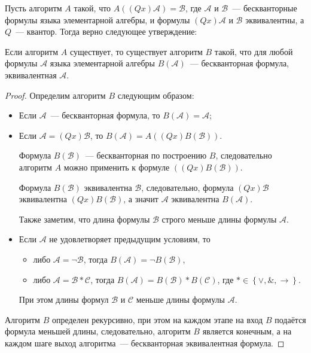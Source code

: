 Пусть алгоритм $A$ такой, что $A\left(\left(Qx\right)\mathcal{A}\right) = \mathcal{B}$, где $\mathcal{A}$ и $\mathcal{B}$~--- бескванторные формулы языка элементарной алгебры, и формулы $(Qx)\mathcal{A}$ и $\mathcal{B}$ эквивалентны, а $Q$~--- квантор. Тогда верно следующее утверждение:
\begin{proposal}\label{algB}
    Если алгоритм $A$ существует, то существует алгоритм $B$ такой, что для любой формулы $\mathcal{A}$ языка элементарной алгебры $B\left(\mathcal{A}\right)$~--- бескванторная формула, эквивалентная $\mathcal{A}$.
\end{proposal}   
\begin{proof}
    Определим алгоритм $B$ следующим образом:
    \begin{itemize}
        \item Если $\mathcal{A}$~--- бескванторная формула, то $B\left(\mathcal{A}\right) = \mathcal{A}$;
        \item Если $\mathcal{A} = \left(Qx\right)\mathcal{B}$, то $B\left(\mathcal{A}\right) = A\left(\left(Qx\right)B\left(\mathcal{B}\right)\right)$. 
        
        Формула $B\left(\mathcal{B}\right)$~--- бескванторная по построению $B$, следовательно алгоритм $A$ можно применить к формуле $\left(\left(Qx\right)B\left(\mathcal{B}\right)\right)$. 
        
        Формула $B\left(\mathcal{B}\right)$ эквивалентна $\mathcal{B}$, следовательно, формула $\left(Qx\right)\mathcal{B}$ эквивалентна $\left(Qx\right)B\left(\mathcal{B}\right)$, а значит $\mathcal{A}$ эквивалентна $B\left(\mathcal{A}\right)$.
        
        Также заметим, что длина формулы $\mathcal{B}$ строго меньше длины формулы $\mathcal{A}$.
        \item Если $\mathcal{A}$ не удовлетворяет предыдущим условиям, то
        \begin{itemize}
            \item либо $\mathcal{A} = \lnot \mathcal{B}$, тогда $B\left(\mathcal{A}\right) = \lnot B\left(\mathcal{B}\right)$,
            \item либо $\mathcal{A} = \mathcal{B} * \mathcal{C}$, тогда $B\left(\mathcal{A}\right) = B\left(\mathcal{B}\right) * B\left(\mathcal{C}\right)$, где $* \in \left\{\lor, \&, \to\right\}$.
        \end{itemize}
        При этом длины формул $\mathcal{B}$ и $\mathcal{C}$ меньше длины формулы $\mathcal{A}$.
    \end{itemize}
    Алгоритм $B$ определен рекурсивно, при этом на каждом этапе на вход $B$ подаётся формула меньшей длины, следовательно, алгоритм $B$ является конечным, а на каждом шаге выход алгоритма~--- бескванторная эквивалентная формула.
\end{proof} 

